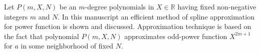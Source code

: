 Let $P(m, X, N)$ be an $m$-degree polynomials in $X\in\mathbb{R}$
having fixed non-negative integers $m$ and $N$.
In this manuscript an efficient method of spline approximation for power function is shown and discussed.
Approximation technique is based on the fact that polynomial $P(m, X, N)$
approximates odd-power function $X^{2m+1}$ for $a$ in some neighborhood of fixed $N$.